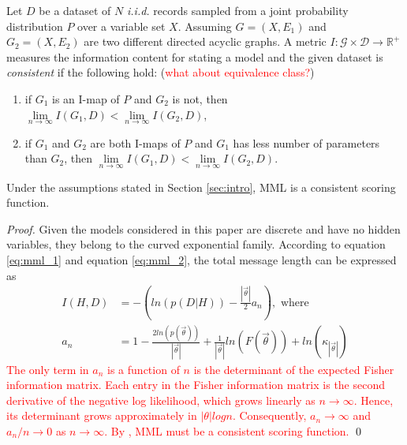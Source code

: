 \begin{definition} 
\label{def:consistent}
Let $D$ be a dataset of $N$ \textit{i.i.d.} records sampled from a joint probability distribution $P$ over a variable set $X$. Assuming $G=(X,E_1)$ and $G_2=(X,E_2)$ are two different directed acyclic graphs. A metric $I:\mathcal{G} \times \mathcal{D} \rightarrow \mathbb{R}^+$ measures the information content for stating a model and the given dataset is \textit{consistent} if the following hold: (\textcolor{red}{what about equivalence class?})
\begin{enumerate}
\item if $G_1$ is an I-map of $P$ and $G_2$ is not, then $\lim\limits_{n \rightarrow \infty} I(G_1, D) < \lim\limits_{n \rightarrow \infty} I(G_2, D)$,
\item if $G_1$ and $G_2$ are both I-maps of $P$ and $G_1$ has less number of parameters than $G_2$, then $\lim\limits_{n \rightarrow \infty} I(G_1, D) < \lim\limits_{n \rightarrow \infty} I(G_2, D)$.
\end{enumerate}
\end{definition}

\begin{proposition}
Under the assumptions stated in Section \ref{sec:intro}, MML is a consistent scoring function.
\end{proposition}

\begin{proof}
Given the models considered in this paper are discrete and have no hidden variables, they belong to the curved exponential family\cite{geiger2001stratified}. According to equation \ref{eq:mml_1} and equation \ref{eq:mml_2}, the total message length can be expressed as 
\begin{align*}
I(H, D) &= - \left(ln(p(D|H)) - \frac{|\vec{\theta}|}{2} a_n\right), \text{ where} \\
a_n &= 1 - \frac{2ln(p(\vec{\theta}))}{|\vec{\theta}|} + \frac{1}{|\vec{\theta}|} ln(F(\vec{\theta})) + ln(\kappa_{|\vec{\theta}|})
\end{align*}
\textcolor{red}{The only term in $a_n$ is a function of $n$ is the determinant of the expected Fisher information matrix. Each entry in the Fisher information matrix is the second derivative of the negative log likelihood, which grows linearly as $n\rightarrow \infty$. Hence, its determinant grows approximately in $|\theta|log n$. Consequently, $a_n \rightarrow \infty$ and $a_n/n \rightarrow 0$ as $n \rightarrow \infty$. By \cite{haughton1988choice}, MML must be a consistent scoring function.} \qed
\end{proof}

